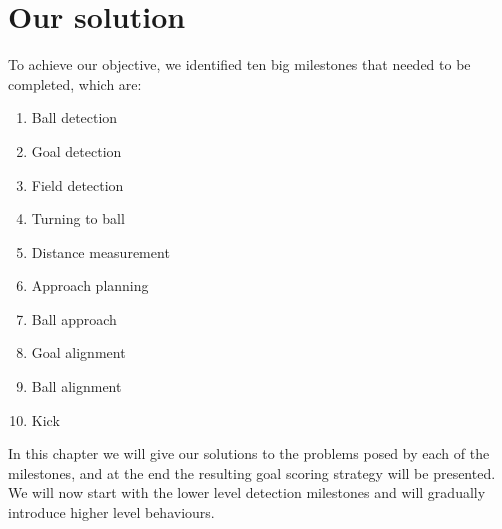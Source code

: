 \chapter{Our solution}

To achieve our objective, we identified ten big milestones that needed to be
completed, which are:

\begin{enumerate}

  \item Ball detection

  \item Goal detection

  \item Field detection

  \item Turning to ball

  \item Distance measurement

  \item Approach planning

  \item Ball approach

  \item Goal alignment

  \item Ball alignment

  \item Kick

\end{enumerate}

In this chapter we will give our solutions to the problems posed by each of the
milestones, and at the end the resulting goal scoring strategy will be
presented. We will now start with the lower level detection milestones and
will gradually introduce higher level behaviours.
